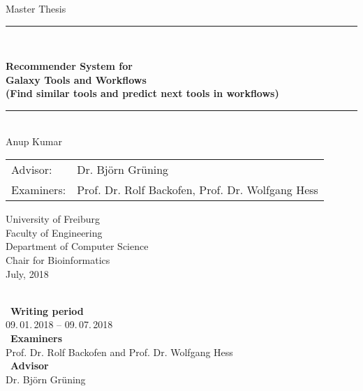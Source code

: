 \begin{titlepage}
\begin{center}

\newcommand{\HorizontalLine}{\rule{\linewidth}{0.3mm}}

{\Large Master Thesis}\\[1.3cm]


\HorizontalLine \\[0.4cm]
\begin{spacing}{3}
    {\huge \bfseries Recommender System for } \\
    {\huge \bfseries Galaxy Tools and Workflows } \\
    {\Large \bfseries (Find similar tools and predict next tools in workflows) }\\[0.25cm]
\end{spacing}
\HorizontalLine \\[1.5cm]


{\Large Anup Kumar } \\[2cm]


\begin{tabular}[hc]{>{\Large}l >{\Large}l}
  Advisor: & Dr. Björn Grüning \\[0.3cm]
  Examiners: & Prof. Dr. Rolf Backofen, Prof. Dr. Wolfgang Hess \\[1.2cm]
\end{tabular}
\vfill  %

\Large {
    University of Freiburg\\
    Faculty of Engineering\\
    Department of Computer Science\\
    Chair for Bioinformatics\\[1cm]
    July, 2018
    \\
}
\end{center}
\end{titlepage}

\ \vfill \ \\  %
\
\textbf{Writing period}            \smallskip{} \\
09.\,01.\,2018 -- 09.\,07.\,2018   \bigskip{} \\
\
\textbf{Examiners}                 \smallskip{} \\
Prof. Dr. Rolf Backofen and Prof. Dr. Wolfgang Hess               \bigskip{} \\
\
\textbf{Advisor}                   \smallskip{} \\
Dr. Björn Grüning
